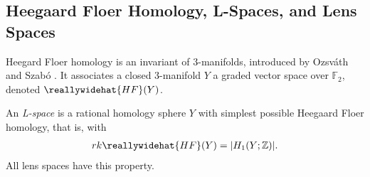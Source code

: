 

\subsection{Heegaard Floer Homology, L-Spaces, and Lens Spaces}
Heegard Floer homology is an invariant of 3-manifolds, introduced by Ozsv\'{a}th and Szab\'{o} \cite{OzsvathSzabo}. It associates a closed 3-manifold $Y$ a graded vector space over $\mathbb{F}_2$, denoted $\reallywidehat{HF}(Y)$.
\begin{definition}An \emph{L-space} is a rational homology sphere $Y$ with simplest possible Heegaard Floer homology, that is, with
\begin{align*}
rk \reallywidehat{HF}(Y) = |H_1(Y ; \mathbb{Z})|.
\end{align*}
All lens spaces have this property.
\end{definition}